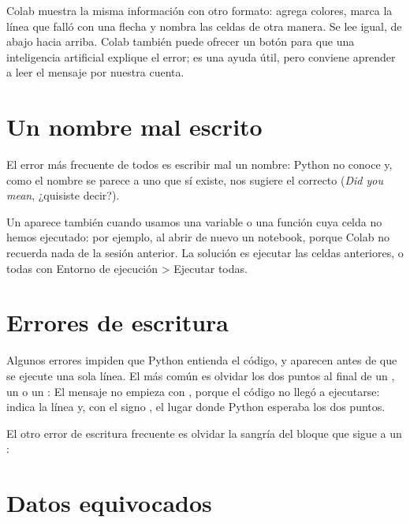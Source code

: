 \begin{parasabermas}
Colab muestra la misma información con otro formato: agrega colores, marca la
línea que falló con una flecha \py{---->} y nombra las celdas de otra
manera. Se lee igual, de abajo hacia arriba. Colab también puede ofrecer un
botón para que una inteligencia artificial explique el error; es una ayuda
útil, pero conviene aprender a leer el mensaje por nuestra cuenta.
\end{parasabermas}

\section{Un nombre mal escrito}\label{sec:b_nombre}

El error más frecuente de todos es escribir mal un nombre:
Python no conoce  y, como el nombre se parece a uno que sí
existe, nos sugiere el correcto (\emph{Did you mean}, ¿quisiste decir?).

Un  aparece también cuando usamos una variable o una función
cuya celda no hemos ejecutado: por ejemplo, al abrir de nuevo un notebook,
porque Colab no recuerda nada de la sesión anterior. La solución es ejecutar
las celdas anteriores, o todas con \textsf{Entorno de ejecución > Ejecutar
todas}.

\section{Errores de escritura}\label{sec:b_escritura}

Algunos errores impiden que Python entienda el código, y aparecen antes de que
se ejecute una sola línea. El más común es olvidar los dos puntos al final de
un , un  o un :
El mensaje no empieza con , porque el código no llegó a
ejecutarse: indica la línea y, con el signo \py{^}, el
lugar donde Python esperaba los dos puntos.

El otro error de escritura frecuente es olvidar la sangría del bloque que
sigue a un :

\section{Datos equivocados}\label{sec:b_datos}

